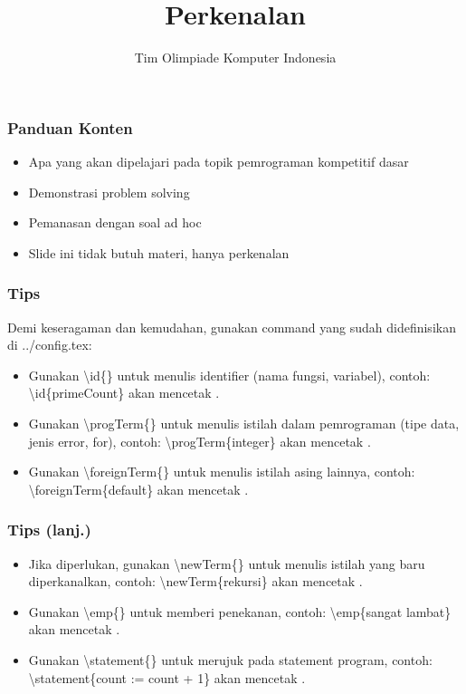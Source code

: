

\title{Perkenalan}
\author{Tim Olimpiade Komputer Indonesia}
\date{}



\begin{frame}
\titlepage
\end{frame}

\begin{frame}
\frametitle{Panduan Konten}
\begin{itemize}
  \item Apa yang akan dipelajari pada topik pemrograman kompetitif dasar
  \item Demonstrasi problem solving
  \item Pemanasan dengan soal ad hoc
  \item Slide ini tidak butuh materi, hanya perkenalan
\end{itemize}
\end{frame}

\begin{frame}
\frametitle{Tips}
Demi keseragaman dan kemudahan, gunakan command yang sudah didefinisikan di ../config.tex:
\begin{itemize}
  \item Gunakan \textbackslash id\{\} untuk menulis identifier (nama fungsi, variabel), contoh: \textbackslash id\{primeCount\} akan mencetak .
  \item Gunakan \textbackslash progTerm\{\} untuk menulis istilah dalam pemrograman (tipe data, jenis error, for), contoh: \textbackslash progTerm\{integer\} akan mencetak .
  \item Gunakan \textbackslash foreignTerm\{\} untuk menulis istilah asing lainnya, contoh: \textbackslash foreignTerm\{default\} akan mencetak .
\end{itemize}
\end{frame}

\begin{frame}
\frametitle{Tips (lanj.)}
\begin{itemize}
  \item Jika diperlukan, gunakan \textbackslash newTerm\{\} untuk menulis istilah yang baru diperkanalkan, contoh: \textbackslash newTerm\{rekursi\} akan mencetak .
  \item Gunakan \textbackslash emp\{\} untuk memberi penekanan, contoh: \textbackslash emp\{sangat lambat\} akan mencetak .
  \item Gunakan \textbackslash statement\{\} untuk merujuk pada statement program, contoh: \textbackslash statement\{count := count + 1\} akan mencetak .
\end{itemize}
\end{frame}


